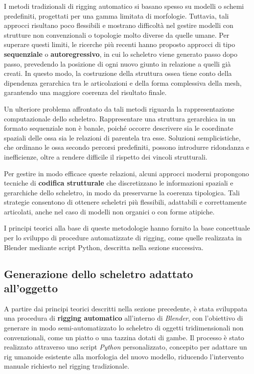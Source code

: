 I metodi tradizionali di rigging automatico si basano spesso su modelli o schemi predefiniti, progettati per una gamma limitata di morfologie. Tuttavia, tali approcci risultano poco flessibili e mostrano difficoltà nel gestire modelli con strutture non convenzionali o topologie molto diverse da quelle umane. Per superare questi limiti, le ricerche più recenti hanno proposto approcci di tipo \textbf{sequenziale} o \textbf{autoregressivo}, in cui lo scheletro viene generato passo dopo passo, prevedendo la posizione di ogni nuovo giunto in relazione a quelli già creati. In questo modo, la costruzione della struttura ossea tiene conto della dipendenza gerarchica tra le articolazioni e della forma complessiva della mesh, garantendo una maggiore coerenza del risultato finale.

Un ulteriore problema affrontato da tali metodi riguarda la rappresentazione computazionale dello scheletro. Rappresentare una struttura gerarchica in un formato sequenziale non è banale, poiché occorre descrivere sia le coordinate spaziali delle ossa sia le relazioni di parentela tra esse. Soluzioni semplicistiche, che ordinano le ossa secondo percorsi predefiniti, possono introdurre ridondanza e inefficienze, oltre a rendere difficile il rispetto dei vincoli strutturali.

Per gestire in modo efficace queste relazioni, alcuni approcci moderni propongono tecniche di \textbf{codifica strutturale} che discretizzano le informazioni spaziali e gerarchiche dello scheletro, in modo da preservarne la coerenza tipologica. Tali strategie consentono di ottenere scheletri più flessibili, adattabili e correttamente articolati, anche nel caso di modelli non organici o con forme atipiche.

I principi teorici alla base di queste metodologie hanno fornito la base concettuale per lo sviluppo di procedure automatizzate di rigging, come quelle realizzata in Blender mediante script Python, descritta nella sezione successiva.


\subsection{Generazione dello scheletro adattato all'oggetto}

A partire dai principi teorici descritti nella sezione precedente, è stata sviluppata una procedura di \textbf{rigging automatico} all'interno di \textit{Blender}, con l'obiettivo di generare in modo semi-automatizzato lo scheletro di oggetti tridimensionali non convenzionali, come un piatto o una tazzina dotati di gambe. Il processo è stato realizzato attraverso uno script \textit{Python} personalizzato, concepito per adattare un rig umanoide esistente alla morfologia del nuovo modello, riducendo l'intervento manuale richiesto nel rigging tradizionale.

